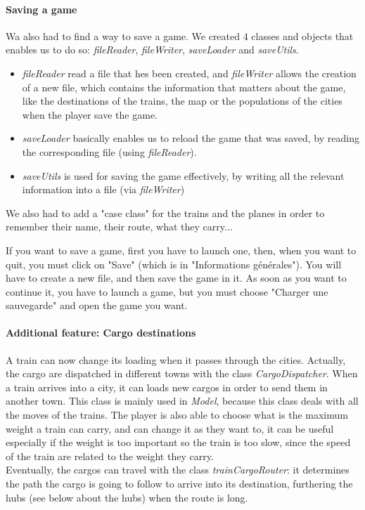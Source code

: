 \documentclass[a4paper]{article}
\begin{document}
	\paragraph{Saving a game} 
	Wa also had to find a way to save a game. We created 4 classes and objects that enables us to do so: \textit{fileReader}, \textit{fileWriter}, \textit{saveLoader} and \textit{saveUtils}.
	\begin{itemize}
		\item \textit{fileReader} read a file that hes been created, and \textit{fileWriter} allows the creation of a new file, which contains the information that matters about the game, like the destinations of the trains, the map or the populations of the cities when the player save the game.
		\item \textit{saveLoader} basically enables us to reload the game that was saved, by reading the corresponding file (using \textit{fileReader}).
		\item  \textit{saveUtils} is used for saving the game effectively, by writing all the relevant information into a file (via \textit{fileWriter})
	\end{itemize}
	We also had to add a "case class" for the trains and the planes in order to remember their name, their route, what they carry...
	
	If you want to save a game, first you have to launch one, then, when you want to quit, you must click on "Save" (which is in "Informations générales"). You will have to create a new file, and then save the game in it.
	As soon as you want to continue it, you have to launch a game, but you must choose "Charger une sauvegarde" and open the game you want.

	\paragraph{Additional feature: Cargo destinations}
	A train can now change its loading when it passes through the cities. Actually, the cargo are dispatched in different towns with the class \textit{CargoDispatcher}. When a train arrives into a city, it can loads new cargos in order to send them in another town. This class is mainly used in \textit{Model}, because this class deals with all the moves of the trains. The player is also able to choose what is the maximum weight a train can carry, and can change it as they want to, it can be useful especially if the weight is too important so the train is too slow, since the speed of the train are related to the weight they carry.\\ Eventually, the cargos can travel with the class \textit{trainCargoRouter}: it determines the path the cargo is going to follow to arrive into its destination, furthering the hubs (see below about the hubs) when the route is long.
	
\end{document}
